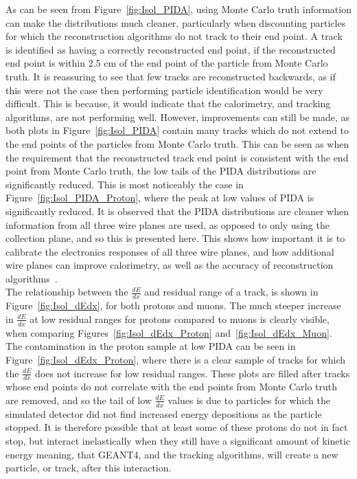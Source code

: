 As can be seen from Figure~\ref{fig:Isol_PIDA}, using Monte Carlo truth information can make the distributions much cleaner, particularly when discounting particles for which the reconstruction algorithms do not track to their end point. A track is identified as having a correctly reconstructed end point, if the reconstructed end point is within 2.5 cm of the end point of the particle from Monte Carlo truth. It is reassuring to see that few tracks are reconstructed backwards, as if this were not the case then performing particle identification would be very difficult. This is because, it would indicate that the calorimetry, and tracking algorithms, are not performing well. However, improvements can still be made, as both plots in Figure~\ref{fig:Isol_PIDA} contain many tracks which do not extend to the end points of the particles from Monte Carlo truth. This can be seen as when the requirement that the reconstructed track end point is consistent with the end point from Monte Carlo truth, the low tails of the PIDA distributions are significantly reduced. This is most noticeably the case in Figure~\ref{fig:Isol_PIDA_Proton}, where the peak at low values of PIDA is significantly reduced. It is observed that the PIDA distributions are cleaner when information from all three wire planes are used, as opposed to only using the collection plane, and so this is presented here. This shows how important it is to calibrate the electronics responses of all three wire planes, and how additional wire planes can improve calorimetry, as well as the accuracy of reconstruction algorithms~\citep{XinSeptFNAL}. \\

The relationship between the $\frac{dE}{dx}$ and residual range of a track, is shown in Figure~\ref{fig:Isol_dEdx}, for both protons and muons. The much steeper increase in $\frac{dE}{dx}$ at low residual ranges for protons compared to muons is clearly visible, when comparing Figures~\ref{fig:Isol_dEdx_Proton} and~\ref{fig:Isol_dEdx_Muon}. The contamination in the proton sample at low PIDA can be seen in Figure~\ref{fig:Isol_dEdx_Proton}, where there is a clear sample of tracks for which the $\frac{dE}{dx}$ does not increase for low residual ranges. These plots are filled after tracks whose end points do not correlate with the end points from Monte Carlo truth are removed, and so the tail of low $\frac{dE}{dx}$ values is due to particles for which the simulated detector did not find increased energy depositions as the particle stopped. It is therefore possible that at least some of these protons do not in fact stop, but interact inelastically when they still have a significant amount of kinetic energy meaning, that GEANT4, and the tracking algorithms, will create a new particle, or track, after this interaction. \\

